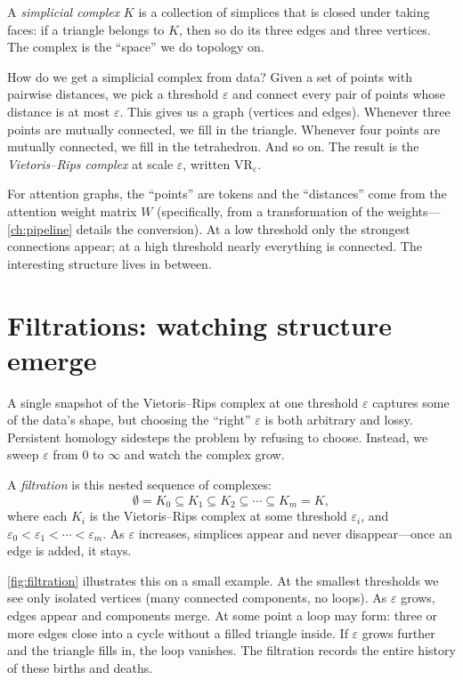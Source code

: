 A \emph{simplicial complex} $K$ is a collection of simplices that is
closed under taking faces: if a triangle belongs to $K$, then so do its
three edges and three vertices.
The complex is the ``space'' we do topology on.

How do we get a simplicial complex from data?
Given a set of points with pairwise distances, we pick a threshold
$\varepsilon$ and connect every pair of points whose distance is at most
$\varepsilon$.
This gives us a graph (vertices and edges).
Whenever three points are mutually connected, we fill in the triangle.
Whenever four points are mutually connected, we fill in the tetrahedron.
And so on.
The result is the \emph{Vietoris--Rips complex} at scale $\varepsilon$,
written $\mathrm{VR}_\varepsilon$.

For attention graphs, the ``points'' are tokens and the ``distances''
come from the attention weight matrix $W$ (specifically, from a
transformation of the weights---\autoref{ch:pipeline} details the
conversion).
At a low threshold only the strongest connections appear;
at a high threshold nearly everything is connected.
The interesting structure lives in between.


\section{Filtrations: watching structure emerge}
\label{sec:filtration}

A single snapshot of the Vietoris--Rips complex at one threshold
$\varepsilon$ captures some of the data's shape, but choosing the
``right'' $\varepsilon$ is both arbitrary and lossy.
Persistent homology sidesteps the problem by refusing to choose.
Instead, we sweep $\varepsilon$ from $0$ to $\infty$ and watch the
complex grow.

A \emph{filtration} is this nested sequence of complexes:
\[
  \emptyset
  = K_0 \subseteq K_1 \subseteq K_2 \subseteq \cdots \subseteq K_m = K,
\]
where each $K_i$ is the Vietoris--Rips complex at some threshold
$\varepsilon_i$, and $\varepsilon_0 < \varepsilon_1 < \cdots <
\varepsilon_m$.
As $\varepsilon$ increases, simplices appear and never disappear---once
an edge is added, it stays.



\autoref{fig:filtration} illustrates this on a small example.
At the smallest thresholds we see only isolated vertices (many connected
components, no loops).
As $\varepsilon$ grows, edges appear and components merge.
At some point a loop may form: three or more edges close into a cycle
without a filled triangle inside.
If $\varepsilon$ grows further and the triangle fills in, the loop
vanishes.
The filtration records the entire history of these births and deaths.


